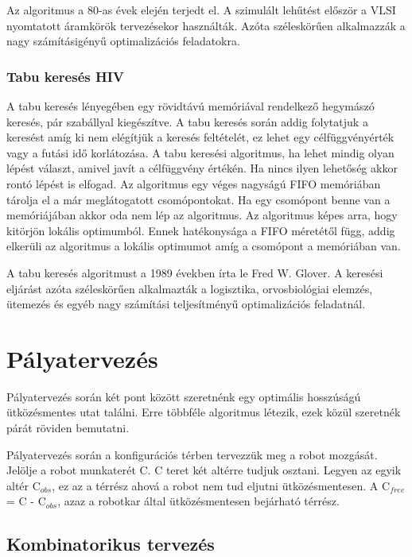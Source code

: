 Az algoritmus a 80-as évek elején terjedt el. A szimulált lehűtést először a VLSI nyomtatott áramkörök tervezésekor használták. Azóta széleskörűen alkalmazzák a nagy számításigényű optimalizációs feladatokra.

\subsubsection{Tabu keresés HIV}

A tabu keresés lényegében egy rövidtávú memóriával rendelkező hegymászó keresés, pár szabállyal kiegészítve. A tabu keresés során addig folytatjuk a keresést amíg ki nem elégítjük a keresés feltételét, ez lehet egy célfüggvényérték vagy a futási idő korlátozása. A tabu keresési algoritmus, ha lehet mindig olyan lépést választ, amivel javít a célfüggvény értékén. Ha nincs ilyen lehetőség akkor rontó lépést is elfogad. Az algoritmus egy véges nagyságú FIFO memóriában tárolja el a már meglátogatott csomópontokat. Ha egy csomópont benne van a memóriájában akkor oda nem lép az algoritmus. Az algoritmus képes arra, hogy kitörjön lokális optimumból. Ennek hatékonysága a FIFO méretétől függ, addig elkerüli az algoritmus a lokális optimumot amíg a csomópont a memóriában van.

A tabu keresés algoritmust a 1989 években írta le Fred W. Glover. A keresési eljárást azóta széleskörűen alkalmazták a logisztika, orvosbiológiai elemzés, ütemezés és egyéb nagy számítási teljesítményű optimalizációs feladatnál.

\cite{russel:2003}

\section{Pályatervezés}

Pályatervezés során két pont között szeretnénk egy optimális hosszúságú ütközésmentes utat találni. Erre  többféle algoritmus létezik, ezek közül szeretnék párát röviden bemutatni.

Pályatervezés során a konfigurációs térben tervezzük meg a robot mozgását. Jelölje a robot munkaterét C. C teret két altérre tudjuk osztani. Legyen az egyik altér C$_{obs}$, ez az a térrész ahová a robot nem tud eljutni ütközésmentesen. A C$_{free}$ = C - C$_{obs}$, azaz a robotkar által ütközésmentesen bejárható térrész.

\subsection{Kombinatorikus tervezés}

